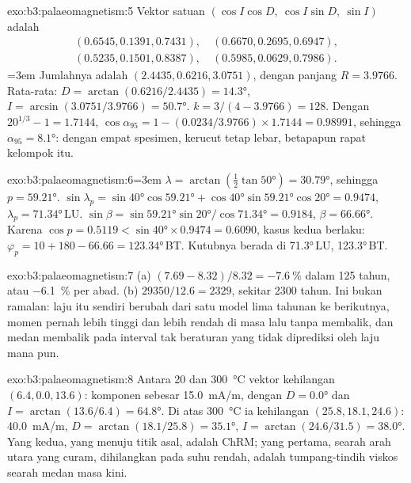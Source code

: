 \begin{solution}{exo:b3:palaeomagnetism:5}
Vektor satuan $(\cos I\cos D,\ \cos I\sin D,\ \sin I)$ adalah
\begin{gather*}
  (0.6545, 0.1391, 0.7431),\quad (0.6670, 0.2695, 0.6947),\\
  (0.5235, 0.1501, 0.8387),\quad (0.5985, 0.0629, 0.7986).
\end{gather*}\begingroup\emergencystretch=3em\relax 
Jumlahnya adalah $(2.4435, 0.6216, 3.0751)$, dengan panjang $R = 3.9766$. Rata-rata:
$D = \arctan(0.6216/2.4435) = \ang{14.3}$, $I = \arcsin(3.0751/3.9766) =
\ang{50.7}$. $k = 3/(4 - 3.9766) = 128$. Dengan $20^{1/3} - 1 = 1.7144$,
$\cos\alpha_{95} = 1 - (0.0234/3.9766)\times1.7144 = 0.98991$, sehingga
$\alpha_{95} = \ang{8.1}$: dengan empat spesimen, kerucut tetap lebar,
betapapun rapat kelompok itu.
\par\endgroup\end{solution}

\begin{solution}{exo:b3:palaeomagnetism:6}\begingroup\emergencystretch=3em\relax 
$\lambda = \arctan(\tfrac12\tan\ang{50}) = \ang{30.79}$, sehingga $p = \ang{59.21}$.
$\sin\lambda_p = \sin\ang{40}\cos\ang{59.21} + \cos\ang{40}\sin\ang{59.21}
\cos\ang{20} = 0.9474$, $\lambda_p = \ang{71.34}$\,LU. $\sin\beta =
\sin\ang{59.21}\sin\ang{20}/\cos\ang{71.34} = 0.9184$, $\beta = \ang{66.66}$.
Karena $\cos p = 0.5119 < \sin\ang{40}\times0.9474 = 0.6090$, kasus kedua
berlaku: $\varphi_p = 10 + 180 - 66.66 = \ang{123.34}$\,BT. Kutubnya berada di
\ang{71.3}\,LU, \ang{123.3}\,BT.
\par\endgroup\end{solution}

\begin{solution}{exo:b3:palaeomagnetism:7}
(a) $(7.69 - 8.32)/8.32 = \qty{-7.6}{\percent}$ dalam 125 tahun, atau
\qty{-6.1}{\percent} per abad. (b) $29350/12.6 = 2329$, sekitar 2300 tahun.
Ini bukan ramalan: laju itu sendiri berubah dari satu model lima tahunan ke
berikutnya, momen pernah lebih tinggi dan lebih rendah di masa lalu tanpa
membalik, dan medan membalik pada interval tak beraturan yang tidak diprediksi oleh
laju mana pun.
\end{solution}

\begin{solution}{exo:b3:palaeomagnetism:8}
Antara 20 dan \qty{300}{\celsius} vektor kehilangan $(6.4, 0.0, 13.6)$: komponen
sebesar \qty{15.0}{mA/m}, dengan $D = \ang{0.0}$ dan
$I = \arctan(13.6/6.4) = \ang{64.8}$. Di atas \qty{300}{\celsius} ia kehilangan $(25.8, 18.1, 24.6)$:
\qty{40.0}{mA/m}, $D = \arctan(18.1/25.8) = \ang{35.1}$, $I =
\arctan(24.6/31.5) = \ang{38.0}$. Yang kedua, yang menuju titik asal, adalah
ChRM; yang pertama, searah arah utara yang curam, dihilangkan pada suhu rendah,
adalah tumpang-tindih viskos searah medan masa kini.
\end{solution}

